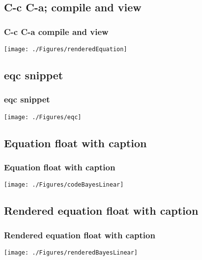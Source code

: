 \documentclass{beamer}
\begin{document}
\subsection{C-c C-a; compile and view}
\begin{frame}
\frametitle{C-c C-a  compile and view}
\begin{center}
\begin{center}
    \texttt{[image: ./Figures/renderedEquation]}
\end{center}
\end{center}
\end{frame}


\subsection{eqc snippet}
\begin{frame}
\frametitle{eqc snippet}
\begin{center}
\begin{center}
    \texttt{[image: ./Figures/eqc]}
\end{center}
\end{center}
\end{frame}


\subsection{Equation float with caption}
\begin{frame}
\frametitle{Equation float with caption}
\begin{center}
\begin{center}
    \texttt{[image: ./Figures/codeBayesLinear]}
\end{center}
\end{center}
\end{frame}


\subsection{Rendered equation float with caption}
\begin{frame}
\frametitle{Rendered equation float with caption}
\begin{center}
\begin{center}
    \texttt{[image: ./Figures/renderedBayesLinear]}
\end{center}
\end{center}
\end{frame}
\end{document}
